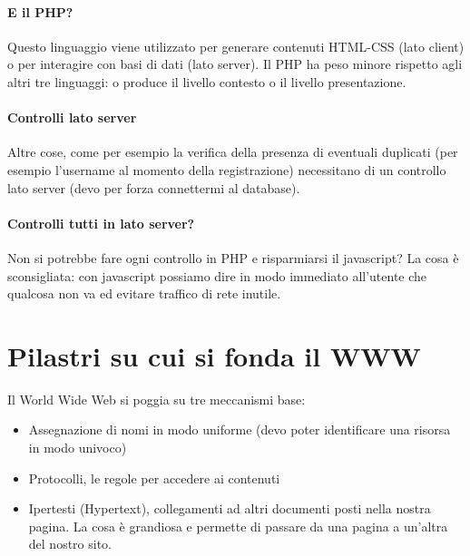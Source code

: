 \documentclass[11pt]{report}
\begin{document}
\paragraph{E il PHP?} Questo linguaggio viene utilizzato per generare contenuti HTML-CSS (lato client) o per interagire con basi di dati (lato server). Il PHP ha peso minore rispetto agli altri tre linguaggi: o produce il livello contesto o il livello presentazione.
\paragraph{Controlli lato server} Altre cose, come per esempio la verifica della presenza di eventuali duplicati (per esempio l'username al momento della registrazione) necessitano di un controllo lato server (devo per forza connettermi al database).
\paragraph{Controlli tutti in lato server?} Non si potrebbe fare ogni controllo in PHP e risparmiarsi il javascript? La cosa è sconsigliata: con javascript possiamo dire in modo immediato all'utente che qualcosa non va ed evitare traffico di rete inutile.

\section*{Pilastri su cui si fonda il WWW}
Il World Wide Web si poggia su tre meccanismi base:
\begin{itemize}
\item Assegnazione di nomi in modo uniforme (devo poter identificare una risorsa in modo univoco)
\item Protocolli, le regole per accedere ai contenuti
\item Ipertesti (Hypertext), collegamenti ad altri documenti posti nella nostra pagina. La cosa è grandiosa e permette di passare da una pagina a un'altra del nostro sito.
\end{itemize}
\end{document}
